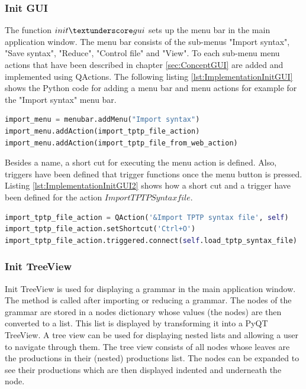 \subsubsection{Init GUI}\label{sec:ImplementationGUIInit}

The function $init\textunderscore gui$ sets up the menu bar in the main application window. The menu bar consists of the sub-menus "Import syntax", "Save syntax", "Reduce", "Control file" and "View". To each sub-menu menu actions that have been described in chapter \ref{sec:ConceptGUI} are added and implemented using QActions. The following listing \ref{lst:ImplementationInitGUI} shows the Python code for adding a menu bar and menu actions for example for the "Import syntax" menu bar.

\begin{lstlisting}[language=Python, basicstyle=\scriptsize	,caption= Implementation of menu bar,label= lst:ImplementationInitGUI]
import_menu = menubar.addMenu("Import syntax")
import_menu.addAction(import_tptp_file_action)
import_menu.addAction(import_tptp_file_from_web_action)
\end{lstlisting}

Besides a name, a short cut for executing the menu action is defined. Also, triggers have been defined that trigger functions once the menu button is pressed. Listing \ref{lst:ImplementationInitGUI2} shows how a short cut and a trigger have been defined for the action $Import TPTP Syntax file$.

\begin{lstlisting}[language=Python, basicstyle=\scriptsize	,caption= Implementation of menu actions,label= lst:ImplementationInitGUI2]
import_tptp_file_action = QAction('&Import TPTP syntax file', self)
import_tptp_file_action.setShortcut('Ctrl+O')
import_tptp_file_action.triggered.connect(self.load_tptp_syntax_file)
\end{lstlisting}


\subsubsection{Init TreeView}\label{sec:ImplementationGUIInitTreeView}
Init TreeView is used for displaying a grammar in the main application window. The method is called after importing or reducing a grammar. The nodes of the grammar are stored in a nodes dictionary whose values (the nodes) are then converted to a list. This list is displayed by transforming it into a PyQT TreeView. A tree view can be used for displaying nested lists and allowing a user to navigate through them. The tree view consists of all nodes whose leaves are the productions in their (nested) productions list. The nodes can be expanded to see their productions which are then displayed indented and underneath the node.

